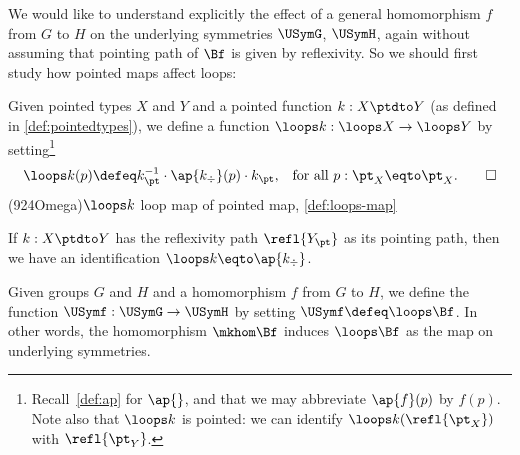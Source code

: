 We would like to understand explicitly the effect of a general homomorphism $f$ from $G$ to $H$
on the underlying symmetries $\USymG$, $\USymH$,
again without assuming that pointing path of $\Bf$ is given by
reflexivity.
So we should first study how pointed maps affect loops:

\begin{definition}\label{def:loops-map}
  Given pointed types $X$ and $Y$ and a pointed function $k : X\ptdto Y$ (as defined in \cref{def:pointedtypes}),
  we define a function $\loops k : \loops X \to \loops Y$ by setting\footnote{%
    Recall~\cref{def:ap} for $\ap{}$, and that we may abbreviate
    $\ap{f}(p)$ by $f(p)$. Note also that $\loops k$ is pointed: 
    we can identify $\loops k(\refl{\pt_X})$ with $\refl{\pt_Y}$.}
  \[
    \loops k(p) \defeq k_\pt^{-1} \cdot \ap{k_\div}(p) \cdot k_\pt
    \text{,\quad for all $p: \pt_X \eqto \pt_X$.}\qedhere
  \]
  \glossary(924Omega){$\protect\loops k$}%
  {loop map of pointed map, \cref{def:loops-map}}
\end{definition}

\begin{remark}\label{rem:loops-map}
  If $k : X \ptdto Y$ has the reflexivity path $\refl{Y_\pt}$ as its
  pointing path, then we have an identification $\loops k \eqto \ap{k_\div}$.
\end{remark}

\begin{definition}\label{def:USym-hom}
  Given groups $G$ and $H$ and a homomorphism  $f$ from $G$ to $H$, 
  we define the function $\USymf : \USymG \to \USymH$
  by setting $\USymf \defeq \loops \Bf$.
  In other words, the homomorphism $\mkhom\Bf$
  induces $\loops\Bf$ as the map on underlying symmetries.
\end{definition}

